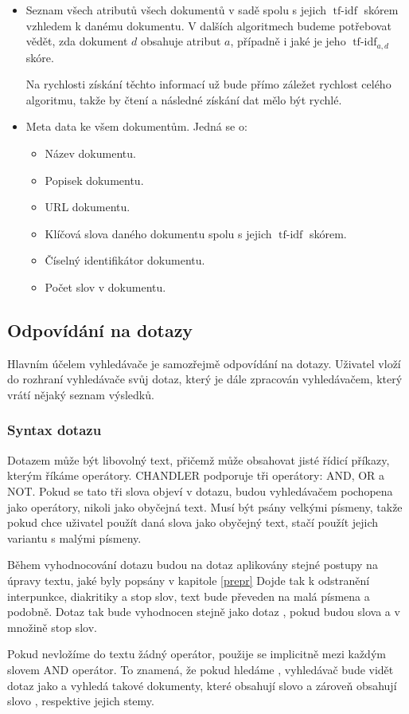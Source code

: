 \documentclass[12pt]{article}
\newcommand{\name}{CHANDLER}
\newcommand{\ssection}[1]{\subsection{#1}}
\newcommand{\sssection}[1]{\subsubsection{#1}}
\DeclareMathOperator{\tfidf}{tf-idf}
\begin{document}
\begin{itemize}
\item Seznam všech atributů všech dokumentů v sadě spolu s jejich $\tfidf$ skórem vzhledem k danému dokumentu. V dalších algoritmech budeme potřebovat vědět, zda dokument $d$ obsahuje atribut $a$, případně i jaké je jeho $\tfidf_{a, d}$ skóre. 

Na rychlosti získání těchto informací už bude přímo záležet rychlost celého algoritmu, takže by čtení a následné získání dat mělo být rychlé. 

\item Meta data ke všem dokumentům. Jedná se o:
	\begin{itemize}
	\item Název dokumentu. 
	\item Popisek dokumentu.
	\item URL dokumentu. 
	\item Klíčová slova daného dokumentu spolu s jejich $\tfidf$ skórem. 
	\item Číselný identifikátor dokumentu.
	\item Počet slov v dokumentu. 
	\end{itemize}
\end{itemize}


\ssection{Odpovídání na dotazy}
Hlavním účelem vyhledávače je samozřejmě odpovídání na dotazy. Uživatel vloží do rozhraní vyhledávače svůj dotaz, který je dále zpracován vyhledávačem, který vrátí nějaký seznam výsledků. 

\sssection{Syntax dotazu}
Dotazem může být libovolný text, přičemž může obsahovat jisté řídicí příkazy, kterým říkáme operátory. \name{} podporuje tři operátory: AND, OR a NOT. Pokud se tato tři slova objeví v dotazu, budou vyhledávačem pochopena jako operátory, nikoli jako obyčejná text. Musí být psány velkými písmeny, takže pokud chce uživatel použít daná slova jako obyčejný text, stačí použít jejich variantu s malými písmeny. 

Během vyhodnocování dotazu budou na dotaz aplikovány stejné postupy na úpravy textu, jaké byly popsány v kapitole \ref{prepr} Dojde tak k odstranění interpunkce, diakritiky a stop slov, text bude převeden na malá písmena a podobně. Dotaz  tak bude vyhodnocen stejně jako dotaz , pokud budou slova  a  v množině stop slov. 

Pokud nevložíme do textu žádný operátor, použije se implicitně mezi každým slovem AND operátor. To znamená, že pokud hledáme , vyhledávač bude vidět dotaz jako  a vyhledá takové dokumenty, které obsahují slovo  a zároveň obsahují slovo , respektive jejich stemy. 
\end{document}
